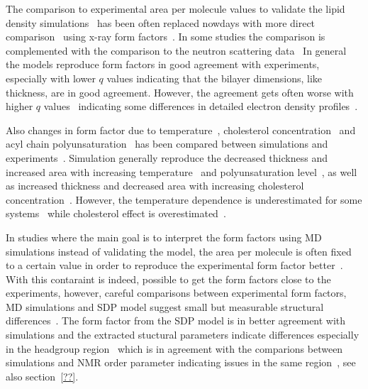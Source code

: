 \documentclass[aps,prl,superscriptaddress,twocolumn]{revtex4}
\begin{document}
The comparison to experimental area per molecule values to validate the lipid density simulations~\cite{tieleman97} has
been often replaced nowdays with more direct comparison~\cite{nagle00} using x-ray form 
factors~\cite{hogberg08,chiu09,klauda10,dickson12,jambeck12,lim12,klauda12,jambeck13,chowdhary13,lee14,maciejewski14,dickson14,tjornhammar14,madej15,kulig15b}.
In some studies the comparison is complemented with the comparison to the neutron scattering data~\cite{dickson12,jambeck12,lee14,dickson14,tjornhammar14,madej15}
In general the models reproduce form factors in good agreement with experiments, especially with lower $q$ values
indicating that the bilayer dimensions, like thickness, are in good agreement. However, the agreement gets often worse
with higher $q$ values~\cite{chiu09,klauda10,klauda12,dickson12,lim12,jambeck12,chowdhary13,jambeck13,lee14,maciejewski14,dickson14,kulig15b,madej15}
indicating some differences in detailed electron density profiles~\cite{??}.

Also changes in form factor due to temperature~\cite{jambeck12,zhuang14}, cholesterol concentration~\cite{jambeck13,madej15} and acyl chain polyunsaturation~\cite{eldho03,klauda12} 
has been compared between simulations and experiments~\cite{eldho03,kucerka05,pan08,hodzic08,kucerka08,pan09,khelasvili10,kucerka11}.
Simulation generally reproduce the decreased thickness and increased area with increasing temperature~\cite{jambeck12,zhuang14} and polyunsaturation level~\cite{eldho03,klauda12}, 
as well as increased thickness and decreased area with increasing cholesterol concentration~\cite{jambeck13,madej15}.
However, the temperature dependence is underestimated for some systems~\cite{jambeck12,zhuang14} while cholesterol
effect is overestimated~\cite{jambeck13,madej15}.

In studies where the main goal is to interpret the form factors using MD simulations instead of validating the model,
the area per molecule is often fixed to a certain value in order to reproduce the experimental form factor better~\cite{sachs03,klauda06,kucerka08a,kucerka08b,braun13}.
With this contaraint is indeed, possible to get the form factors close to the experiments, however, 
careful comparisons between experimental form factors, MD simulations and SDP model suggest small but measurable 
structural differences~\cite{kucerka08a,braun13}. The form factor from the SDP model is in better agreement
with simulations and the extracted stuctural parameters indicate differences especially in the headgroup region~\cite{kucerka08a,braun13} 
which is in agreement with the comparions between simulations and NMR order parameter indicating issues in the same region~\cite{botan15}, 
see also section~\ref{??}.
\end{document}
